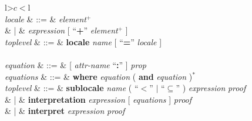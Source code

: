 \begin{isabellebody}
\begin{isamarkuptext}
\begin{table}
\begin{center}
\begin{tabular}{l>$c<$l}
   \\

  \textit{locale} & ::=
  & \textit{element}$^+$ \\
  & | & \textit{expression} [ ``\textbf{+}'' \textit{element}$^+$ ] \\
  \textit{toplevel} & ::=
  & \textbf{locale} \textit{name} [ ``\textbf{=}''
    \textit{locale} ] \\[2ex]

   \\

  \textit{equation} & ::= & [ \textit{attr-name} ``\textbf{:}'' ]
    \textit{prop} \\
  \textit{equations} & ::= &  \textbf{where} \textit{equation} ( \textbf{and}
    \textit{equation} )$^*$  \\
  \textit{toplevel} & ::=
  & \textbf{sublocale} \textit{name} ( ``$<$'' $|$
    ``$\subseteq$'' ) \textit{expression} \textit{proof} \\
  & |
  & \textbf{interpretation}
    \textit{expression} [ \textit{equations} ] \textit{proof} \\
  & |
  & \textbf{interpret}
    \textit{expression} \textit{proof} \\[2ex]

   \\


\end{tabular}
\end{center}
\end{table}
\end{isamarkuptext}
\end{isabellebody}
